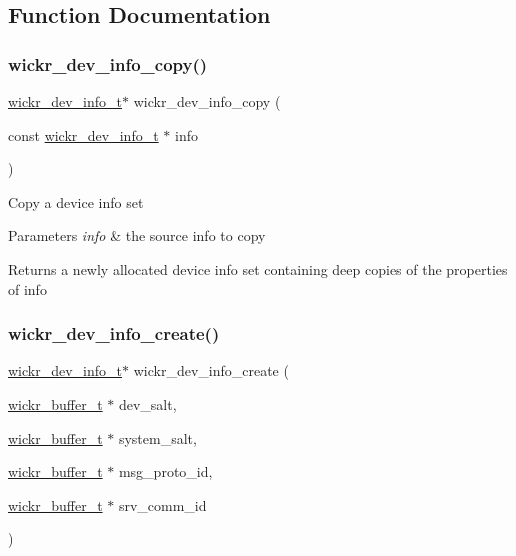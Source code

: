 \subsection{Function Documentation}
\mbox{\label{group__wickr__dev__info_ga1c9d2bdc1778166c49aec43906bb1a83}} 
\subsubsection{\texorpdfstring{wickr\_dev\_info\_copy()}{wickr\_dev\_info\_copy()}}
{\footnotesize\ttfamily \mbox{\hyperlink{structwickr__dev__info}{wickr\+\_\+dev\+\_\+info\+\_\+t}}$\ast$ wickr\+\_\+dev\+\_\+info\+\_\+copy (\begin{DoxyParamCaption}\item[{const \mbox{\hyperlink{structwickr__dev__info}{wickr\+\_\+dev\+\_\+info\+\_\+t}} $\ast$}]{info }\end{DoxyParamCaption})}

Copy a device info set


\begin{DoxyParams}{Parameters}
{\em info} & the source info to copy \\
\hline
\end{DoxyParams}
\begin{DoxyReturn}{Returns}
a newly allocated device info set containing deep copies of the properties of \textquotesingle{}info\textquotesingle{} 
\end{DoxyReturn}
\mbox{\label{group__wickr__dev__info_gaadd5ceb4c6ed757440332e8e27109e5e}} 
\subsubsection{\texorpdfstring{wickr\_dev\_info\_create()}{wickr\_dev\_info\_create()}}
{\footnotesize\ttfamily \mbox{\hyperlink{structwickr__dev__info}{wickr\+\_\+dev\+\_\+info\+\_\+t}}$\ast$ wickr\+\_\+dev\+\_\+info\+\_\+create (\begin{DoxyParamCaption}\item[{\mbox{\hyperlink{structwickr__buffer}{wickr\+\_\+buffer\+\_\+t}} $\ast$}]{dev\+\_\+salt,  }\item[{\mbox{\hyperlink{structwickr__buffer}{wickr\+\_\+buffer\+\_\+t}} $\ast$}]{system\+\_\+salt,  }\item[{\mbox{\hyperlink{structwickr__buffer}{wickr\+\_\+buffer\+\_\+t}} $\ast$}]{msg\+\_\+proto\+\_\+id,  }\item[{\mbox{\hyperlink{structwickr__buffer}{wickr\+\_\+buffer\+\_\+t}} $\ast$}]{srv\+\_\+comm\+\_\+id }\end{DoxyParamCaption})}

